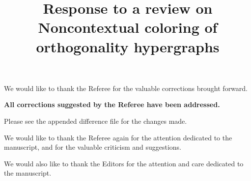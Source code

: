 \documentclass[12pt,a4paper]{article}
\date{}
\title{ Response to a review on\\
{Noncontextual coloring of orthogonality hypergraphs}}
\author{}
\theoremstyle{definition}
\numberwithin{equation}{section}
\begin{document}
        \maketitle


We would like to thank the Referee for the valuable corrections brought forward.

{\bf All corrections suggested by the Referee have been addressed.

Please see the appended difference file for the changes made.}

We would like to thank the Referee again for the attention dedicated to the manuscript, and for the valuable criticism and suggestions.

We would also like to thank the Editors for the attention and care dedicated to the manuscript.
\end{document}

